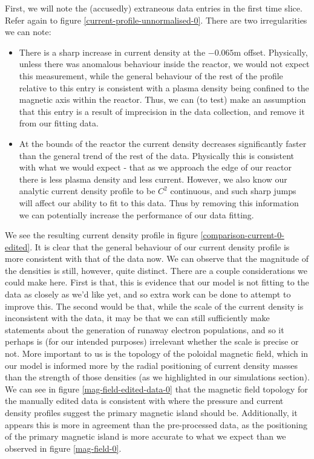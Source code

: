 First, we will note the (accusedly) extraneous data entries in the first time slice. Refer again 
to figure \ref{current-profile-unnormalised-0}. There are two irregularities we can note:
\begin{itemize}
    \item There is a sharp increase in current density at the $-0.065\text{m}$ offset. Physically, unless 
    there was anomalous behaviour inside the reactor, we would not expect this measurement, while the general 
    behaviour of the rest of the profile relative to this entry is consistent with a plasma density being confined to 
    the magnetic axis within the reactor. Thus, we can (to test) make an assumption that this entry is a result of imprecision in 
    the data collection, and remove it from our fitting data.
    \item At the bounds of the reactor the current density decreases significantly faster than the general trend of the 
    rest of the data. Physically this is consistent with what we would expect - that as we approach the edge of our reactor there is 
    less plasma density and less current. However, we also know our analytic current density profile to be $C^{2}$ continuous, 
    and such sharp jumps will affect our ability to fit to this data. Thus by removing this information we can potentially 
    increase the performance of our data fitting.
\end{itemize}
We see the resulting current density profile in figure \ref{comparison-current-0-edited}. It is clear that the general behaviour 
of our current density profile is more consistent with that of the data now. We can observe that the magnitude of the densities is 
still, however, quite distinct. There are a couple considerations we could make here. First is that, this is evidence that 
our model is not fitting to the data as closely as we'd like yet, and so extra work can be done to attempt to improve this. 
The second would be that, while the scale of the current density is inconsistent with the data, it may be that we can still sufficiently 
make statements about the generation of runaway electron populations, and so it perhaps is (for our intended purposes) irrelevant 
whether the scale is precise or not. More important to us is the topology of the poloidal magnetic field, which in our model is 
informed more by the radial positioning of current density masses than the strength of those densities (as we highlighted in our 
simulations section). We can see in figure \ref{mag-field-edited-data-0} that the magnetic field topology for the manually edited data 
is consistent with where the pressure and current density profiles suggest the primary magnetic island should be. Additionally, it 
appears this is more in agreement than the pre-processed data, as the positioning of the primary magnetic island is more 
accurate to what we expect than we observed in figure \ref{mag-field-0}.

